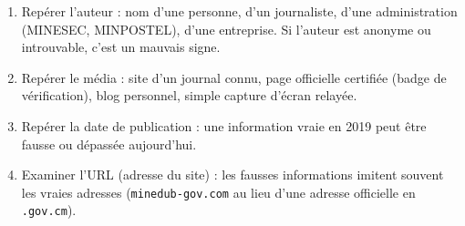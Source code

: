 \documentclass[11pt]{article}
\newcommand{\cle}[1]{{\popxbold\color{popdark}#1}}
\begin{document}
\begin{methode}
\begin{enumerate}
  \item Repérer l'\cle{auteur} : nom d'une personne, d'un journaliste, d'une administration (MINESEC, MINPOSTEL), d'une entreprise. Si l'auteur est anonyme ou introuvable, c'est un mauvais signe.
  \item Repérer le \cle{média} : site d'un journal connu, page officielle certifiée (badge de vérification), blog personnel, simple capture d'écran relayée.
  \item Repérer la \cle{date} de publication : une information vraie en 2019 peut être fausse ou dépassée aujourd'hui.
  \item Examiner l'\cle{URL} (adresse du site) : les fausses informations imitent souvent les vraies adresses (\texttt{minedub-gov.com} au lieu d'une adresse officielle en \texttt{.gov.cm}).
\end{enumerate}
\end{methode}
\end{document}
